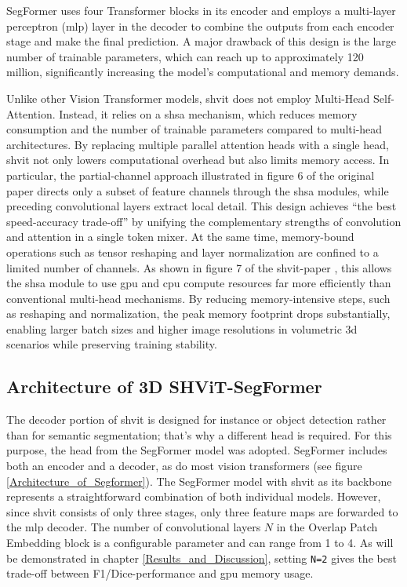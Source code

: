 \medskip

SegFormer uses four Transformer blocks in its encoder and employs a multi-layer perceptron (\gls{mlp}) layer in the decoder to combine the outputs from each encoder stage and make the final prediction. A major drawback of this design is the large number of trainable parameters, which can reach up to approximately 120 million, significantly increasing the model's computational and memory demands.

\medskip

Unlike other Vision Transformer models, \gls{shvit} does not employ Multi-Head Self-Attention. Instead, it relies on a \gls{shsa} mechanism, which reduces memory consumption and the number of trainable parameters compared to multi-head architectures. By replacing multiple parallel attention heads with a single head, \gls{shvit} not only lowers computational overhead but also limits memory access. In particular, the partial-channel approach illustrated in figure 6 of the original paper \cite{yun2024shvit} directs only a subset of feature channels through the \gls{shsa} modules, while preceding convolutional layers extract local detail. This design achieves \enquote{the best speed-accuracy trade-off}\cite{yun2024shvit} by unifying the complementary strengths of convolution and attention in a single token mixer. At the same time, memory-bound operations such as tensor reshaping and layer normalization are confined to a limited number of channels. As shown in figure 7 of the \gls{shvit}-paper \cite{yun2024shvit}, this allows the \gls{shsa} module to use \gls{gpu} and \acrshort{cpu} compute resources far more efficiently than conventional multi-head mechanisms. By reducing memory-intensive steps, such as reshaping and normalization, the peak memory footprint drops substantially, enabling larger batch sizes and higher image resolutions in volumetric \gls{3d} scenarios while preserving training stability. 



\subsection{Architecture of 3D SHViT-SegFormer} \label{sec:Architecture_of_SHViT_Segformer}
The decoder portion of \gls{shvit} is designed for instance or object detection rather than for semantic segmentation; that's why a different head is required. For this purpose, the head from the SegFormer model \cite{xie2021segformersimpleefficientdesign, perera2024segformer3defficienttransformer3d} was adopted. SegFormer includes both an encoder and a decoder, as do most vision transformers (see figure \ref{Architecture_of_Segformer}). The SegFormer model with \gls{shvit} as its backbone represents a straightforward combination of both individual models. However, since \gls{shvit} consists of only three stages, only three feature maps are forwarded to the \gls{mlp} decoder. The number of convolutional layers $N$ in the Overlap Patch Embedding block is a configurable parameter and can range from 1 to 4. As will be demonstrated in chapter \ref{Results_and_Discussion}, setting {\tt N=2} gives the best trade-off between F1/Dice-performance and \gls{gpu} memory usage.


